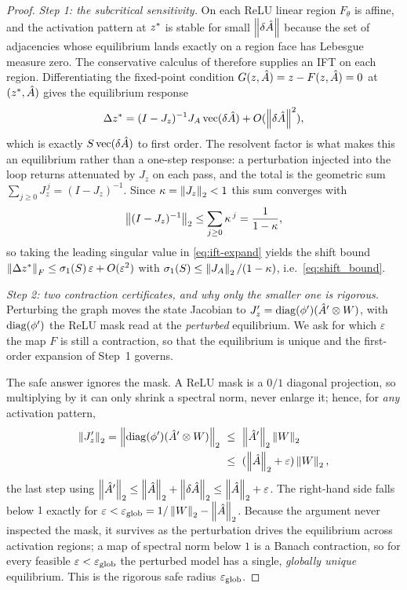 \begin{proof}
\emph{Step 1: the subcritical sensitivity.}
On each ReLU linear region $F_\theta$ is affine, and the activation pattern at $z^{*}$ is stable for
small $\left\|\delta\hat{A}\right\|$ because the set of adjacencies whose equilibrium lands exactly on a region
face has Lebesgue measure zero. The conservative calculus of \citet{bolte2021conservative} therefore
supplies an IFT on each region. Differentiating the fixed-point condition $G(z,\hat{A})=z-F(z,\hat{A})=0$ at
$(z^{*},\hat{A})$ gives the equilibrium response
\begin{equation}
\Delta z^{*}=(I-J_z)^{-1}J_A\,\mathrm{vec}(\delta\hat{A})+O(\left\|\delta\hat{A}\right\|^2),
\label{eq:ift-expand}
\end{equation}
which is exactly $S\,\mathrm{vec}(\delta\hat{A})$ to first order. The resolvent factor is what makes this
an equilibrium rather than a one-step response: a perturbation injected into the loop returns
attenuated by $J_z$ on each pass, and the total is the geometric sum
$\sum_{j\ge0}J_z^{\,j}=(I-J_z)^{-1}$. Since $\kappa=\left\|J_z\right\|_2<1$ this sum converges with
\begin{equation}
\left\|(I-J_z)^{-1}\right\|_2\le\sum_{j\ge0}\kappa^{\,j}=\frac{1}{1-\kappa},
\label{eq:neumann-bound}
\end{equation}
so taking the leading singular value in \eqref{eq:ift-expand} yields the shift bound
$\left\|\Delta z^{*}\right\|_F\le\sigma_1(S)\,\varepsilon+O(\varepsilon^2)$ with
$\sigma_1(S)\le\left\|J_A\right\|_2/(1-\kappa)$, i.e.\ \eqref{eq:shift_bound}.

\emph{Step 2: two contraction certificates, and why only the smaller one is rigorous.}
Perturbing the graph moves the state Jacobian to $J_z'=\operatorname{diag}(\phi')(\hat{A}'\otimes W)$, with $\operatorname{diag}(\phi')$
the ReLU mask read at the \emph{perturbed} equilibrium. We ask for which $\varepsilon$ the map $F$ is still
a contraction, so that the equilibrium is unique and the first-order expansion of Step~1 governs.

The safe answer ignores the mask. A ReLU mask is a $0/1$ diagonal projection, so multiplying by it can only
shrink a spectral norm, never enlarge it; hence, for \emph{any} activation pattern,
\begin{equation}
\begin{split}
\left\|J_z'\right\|_2=\left\|\operatorname{diag}(\phi')(\hat{A}'\otimes W)\right\|_2
&\ \le\ \left\|\hat{A}'\right\|_2\left\|W\right\|_2\\
&\ \le\ (\left\|\hat{A}\right\|_2+\varepsilon)\left\|W\right\|_2,
\end{split}
\label{eq:Jzp-bound}
\end{equation}
the last step using $\left\|\hat{A}'\right\|_2\le\left\|\hat{A}\right\|_2+\left\|\delta\hat{A}\right\|_2\le\left\|\hat{A}\right\|_2+\varepsilon$.
The right-hand side falls below $1$ exactly for $\varepsilon<\varepsilon_{\mathrm{glob}}=1/\left\|W\right\|_2-\left\|\hat{A}\right\|_2$. Because
the argument never inspected the mask, it survives as the perturbation drives the equilibrium across
activation regions; a map of spectral norm below $1$ is a Banach contraction, so for every feasible
$\varepsilon<\varepsilon_{\mathrm{glob}}$ the perturbed model has a single, \emph{globally unique} equilibrium. This is the
rigorous safe radius $\varepsilon_{\mathrm{glob}}$.


\end{proof}
